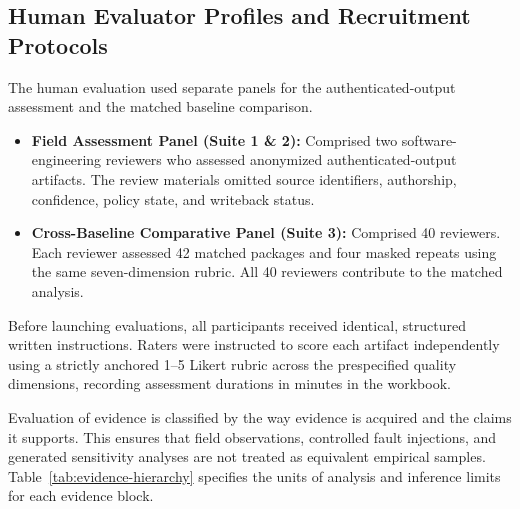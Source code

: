 \documentclass[pdflatex,sn-basic]{sn-jnl}
\begin{document}
\subsection{Human Evaluator Profiles and Recruitment Protocols}
The human evaluation used separate panels for the authenticated-output assessment and the matched baseline comparison.
\begin{itemize}
    \item \textbf{Field Assessment Panel (Suite 1 \& 2):} Comprised two software-engineering reviewers who assessed anonymized authenticated-output artifacts. The review materials omitted source identifiers, authorship, confidence, policy state, and writeback status.
    \item \textbf{Cross-Baseline Comparative Panel (Suite 3):} Comprised 40 reviewers. Each reviewer assessed 42 matched packages and four masked repeats using the same seven-dimension rubric. All 40 reviewers contribute to the matched analysis.
\end{itemize}
Before launching evaluations, all participants received identical, structured written instructions. Raters were instructed to score each artifact independently using a strictly anchored 1--5 Likert rubric across the prespecified quality dimensions, recording assessment durations in minutes in the workbook.

Evaluation of evidence is classified by the way evidence is acquired and the claims it supports. This ensures that field observations, controlled fault injections, and generated sensitivity analyses are not treated as equivalent empirical samples. Table~\ref{tab:evidence-hierarchy} specifies the units of analysis and inference limits for each evidence block.
\end{document}
